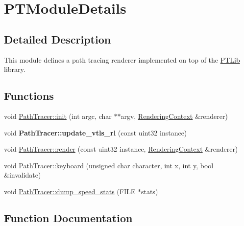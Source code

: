 \hypertarget{group___p_t_module_details}{}\section{P\+T\+Module\+Details}
\label{group___p_t_module_details}


\subsection{Detailed Description}
This module defines a path tracing renderer implemented on top of the \hyperlink{group___p_t_lib}{P\+T\+Lib} library. \subsection*{Functions}
\begin{DoxyCompactItemize}
\item 
void \hyperlink{group___p_t_module_details_ga923b8d146b23f93356f6c74971c4d6f7}{Path\+Tracer\+::init} (int argc, char $\ast$$\ast$argv, \hyperlink{struct_rendering_context}{Rendering\+Context} \&renderer)
\item 
\mbox{\label{group___p_t_module_details_ga8151931a9569e9854eeabad851ea383d}} 
void {\bfseries Path\+Tracer\+::update\+\_\+vtls\+\_\+rl} (const uint32 instance)
\item 
void \hyperlink{group___p_t_module_details_ga3e6317495ea6c761968a893b3a54824e}{Path\+Tracer\+::render} (const uint32 instance, \hyperlink{struct_rendering_context}{Rendering\+Context} \&renderer)
\item 
void \hyperlink{group___p_t_module_details_gad08f55d7ba075e0b71a4aa729c07986d}{Path\+Tracer\+::keyboard} (unsigned char character, int x, int y, bool \&invalidate)
\item 
void \hyperlink{group___p_t_module_details_gaae1782405577d0072ff78570ec0025cc}{Path\+Tracer\+::dump\+\_\+speed\+\_\+stats} (F\+I\+LE $\ast$stats)
\end{DoxyCompactItemize}


\subsection{Function Documentation}
\mbox{\label{group___p_t_module_details_gaae1782405577d0072ff78570ec0025cc}} 

